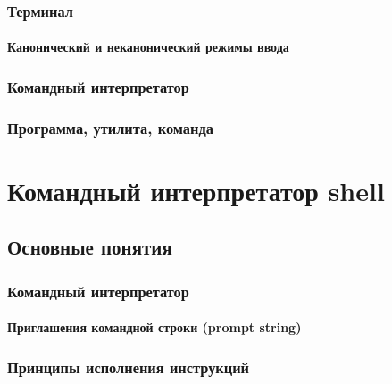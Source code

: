 \documentclass[oneside]{book}
\begin{document}
		\section{Терминал}
		
			
			\subsection{Канонический и неканонический режимы ввода}
			
		
		\section{Командный интерпретатор}
		
		
		\section{Программа, утилита, команда}
		



\part{Командный интерпретатор shell}
%

	\chapter{Основные понятия}
	
		
		\section{Командный интерпретатор}
		
		
			\subsection{Приглашения командной строки (prompt string)}
						
					
		\section{Принципы исполнения инструкций}
		
\end{document}
